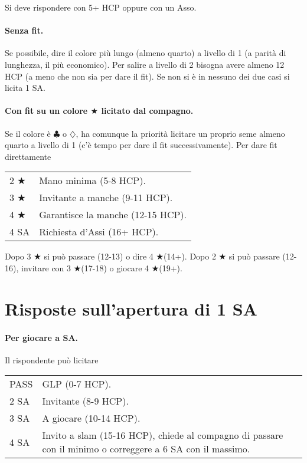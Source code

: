 \documentclass[a4paper,10pt]{article}
\renewcommand{\c}{$\clubsuit$\xspace}
\renewcommand{\d}{$\diamondsuit$\xspace}
\renewcommand{\j}{$\bigstar$\xspace}
\newcommand{\sa}{SA\xspace}
\newcommand{\smallspace}{\vskip0.3cm}
\newenvironment{twocol}
  {\smallspace\noindent\begin{tabular}{l p{0.78\textwidth}}}
  {\end{tabular}\smallspace}
\begin{document}
Si deve rispondere con 5+ HCP oppure con un Asso.

\paragraph{Senza fit.} Se possibile, dire il colore più lungo (almeno quarto) a livello di 1 (a parità di lunghezza, il più economico). Per salire a livello di 2 bisogna avere almeno 12 HCP (a meno che non sia per dare il fit). Se non si è in nessuno dei due casi si licita 1 \sa.%

\paragraph{Con fit su un colore \j licitato dal compagno.} Se il colore è \c o \d, ha comunque la priorità licitare un proprio seme almeno quarto a livello di 1 (c'è tempo per dare il fit successivamente). Per dare fit direttamente
\begin{twocol}
 2 \j & Mano minima (5-8 HCP).\\
 3 \j & Invitante a manche (9-11 HCP).\\
 4 \j & Garantisce la manche (12-15 HCP).\\
 4 \sa & Richiesta d'Assi (16+ HCP).
\end{twocol}

Dopo 3 \j si può passare (12-13) o dire 4 \j (14+). Dopo 2 \j si può passare (12-16), invitare con 3 \j (17-18) o giocare 4 \j (19+).

\section{Risposte sull'apertura di 1 \sa}

\paragraph{Per giocare a \sa.} Il rispondente può licitare

\begin{twocol}
 PASS & GLP (0-7 HCP).\\
 2 \sa & Invitante (8-9 HCP).\\
 3 \sa & A giocare (10-14 HCP).\\
 4 \sa & Invito a slam (15-16 HCP), chiede al compagno di passare con il minimo o correggere a 6 \sa con il massimo.
\end{twocol}
\end{document}
